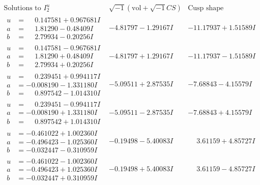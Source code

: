 \documentclass[1p]{elsarticle_modified}
\theoremstyle{definition}
\newcommand{\I}{\sqrt{-1}}
\begin{document}
$$\begin{array}{c|c|c}  
\text{Solutions to }I^u_{2}& \I (\text{vol} + \sqrt{-1}CS) & \text{Cusp shape}\\
 \hline 
\begin{aligned}
u &= \phantom{-}0.147581 + 0.967681 I \\
a &= \phantom{-}1.81290 - 0.48409 I \\
b &= \phantom{-}2.79934 - 0.20256 I\end{aligned}
 & -4.81797 - 1.29167 I & -11.17937 + 1.51589 I \\ \hline\begin{aligned}
u &= \phantom{-}0.147581 - 0.967681 I \\
a &= \phantom{-}1.81290 + 0.48409 I \\
b &= \phantom{-}2.79934 + 0.20256 I\end{aligned}
 & -4.81797 + 1.29167 I & -11.17937 - 1.51589 I \\ \hline\begin{aligned}
u &= \phantom{-}0.239451 + 0.994117 I \\
a &= -0.008190 - 1.331180 I \\
b &= \phantom{-}0.897542 - 1.014310 I\end{aligned}
 & -5.09511 + 2.87535 I & -7.68843 - 4.15579 I \\ \hline\begin{aligned}
u &= \phantom{-}0.239451 - 0.994117 I \\
a &= -0.008190 + 1.331180 I \\
b &= \phantom{-}0.897542 + 1.014310 I\end{aligned}
 & -5.09511 - 2.87535 I & -7.68843 + 4.15579 I \\ \hline\begin{aligned}
u &= -0.461022 + 1.002360 I \\
a &= -0.496423 - 1.025360 I \\
b &= -0.032447 - 0.310959 I\end{aligned}
 & -0.19498 - 5.40083 I & \phantom{-}3.61159 + 4.85727 I \\ \hline\begin{aligned}
u &= -0.461022 - 1.002360 I \\
a &= -0.496423 + 1.025360 I \\
b &= -0.032447 + 0.310959 I\end{aligned}
 & -0.19498 + 5.40083 I & \phantom{-}3.61159 - 4.85727 I \\ \hline\begin{aligned}

\end{aligned}
\end{array}$$
\end{document}
